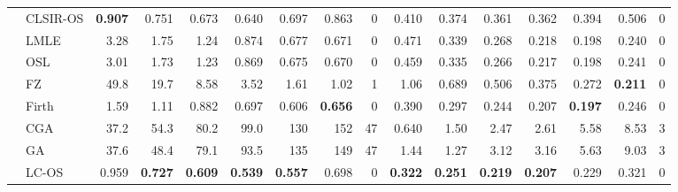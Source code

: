 \begin{tabular}{llrrrrrrrrrrrrrr}
 & CLSIR-OS & \textbf{0.907} & 0.751 & 0.673 & 0.640 & 0.697 & 0.863 & 0 & 0.410 & 0.374 & 0.361 & 0.362 & 0.394 & 0.506 & 0\\
 & LMLE & 3.28 & 1.75 & 1.24 & 0.874 & 0.677 & 0.671 & 0 & 0.471 & 0.339 & 0.268 & 0.218 & 0.198 & 0.240 & 0\\
 & OSL & 3.01 & 1.73 & 1.23 & 0.869 & 0.675 & 0.670 & 0 & 0.459 & 0.335 & 0.266 & 0.217 & 0.198 & 0.241 & 0\\
 & FZ & 49.8 & 19.7 & 8.58 & 3.52 & 1.61 & 1.02 & 1 & 1.06 & 0.689 & 0.506 & 0.375 & 0.272 & \textbf{0.211} & 0\\
 & Firth & 1.59 & 1.11 & 0.882 & 0.697 & 0.606 & \textbf{0.656} & 0 & 0.390 & 0.297 & 0.244 & 0.207 & \textbf{0.197} & 0.246 & 0\\
 & CGA & 37.2 & 54.3 & 80.2 & 99.0 & 130 & 152 & 47 & 0.640 & 1.50 & 2.47 & 2.61 & 5.58 & 8.53 & 3\\
 & GA & 37.6 & 48.4 & 79.1 & 93.5 & 135 & 149 & 47 & 1.44 & 1.27 & 3.12 & 3.16 & 5.63 & 9.03 & 3\\
 & LC-OS & 0.959 & \textbf{0.727} & \textbf{0.609} & \textbf{0.539} & \textbf{0.557} & 0.698 & 0 & \textbf{0.322} & \textbf{0.251} & \textbf{0.219} & \textbf{0.207} & 0.229 & 0.321 & 0\\
\bottomrule
\end{tabular}